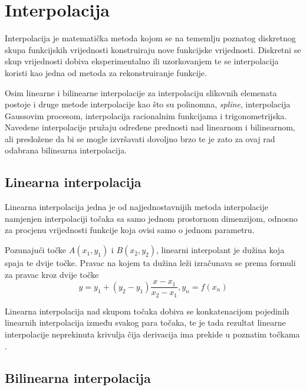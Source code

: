\section{Interpolacija}
\label{sec:interpolacija}

Interpolacija je matematička metoda kojom se na tememlju poznatog diskretnog skupa funkcijskih vrijednosti konstruiraju nove funkcijske vrijednosti. Diskretni se skup vrijednosti dobiva eksperimentalno ili uzorkovanjem te se interpolacija koristi kao jedna od metoda za rekonstruiranje funkcije. \citep{_interpolation_2013}

Osim linearne i bilinearne interpolacije za interpolaciju slikovnih elemenata postoje i druge metode interpolacije kao što su polinomna, \emph{spline}, interpolacija Gaussovim procesom, interpolacija racionalnim funkcijama i trigonometrijska. Navedene interpolacije pružaju određene prednosti nad linearnom i bilinearnom, ali presložene da bi se mogle izvršavati dovoljno brzo te je zato za ovaj rad odabrana bilinearna interpolacija.

\subsection{Linearna interpolacija}
\label{subsec:linInt}
\label{interpolation:lin}

Linearna interpolacija jedna je od najjednostavnijih metoda interpolacije namjenjen interpolaciji točaka sa samo jednom prostornom dimenzijom, odnosno za procjenu vrijednosti funkcije koja ovisi samo o jednom parametru. 

Pozunajući točke $A (x_1, y_1)$ i $B (x_2, y_2)$, linearni interpolant je dužina koja spaja te dvije točke. Pravac na kojem ta dužina leži izračunava se prema formuli za pravac kroz dvije točke \citep{_linear_2013}
\begin{equation}
	y = y_1 + (y_2 - y_1) \frac{x - x_1}{x_2 - x_1}, y_n = f(x_n)
\end{equation}

Linearna interpolacija nad skupom točaka dobiva se konkatenacijom pojedinih linearnih interpolacija između svakog para točaka, te je tada rezultat linearne interpolacije neprekinuta krivulja čija derivacija ima prekide u poznatim točkama \citep{Bosilj2010} \citep{_linear_2013}.

\subsection{Bilinearna interpolacija}
\label{subsec:bilinInt}

